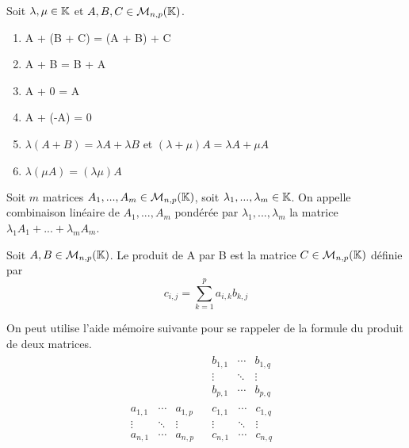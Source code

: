 \documentclass[a4paper, 12pt]{article}
\begin{document}
\begin{proprietes}
    Soit $\lambda, \mu \in \mathbb{K}$ et $A, B, C \in \mathcal{M}_{n, p}(\mathbb{K})$.
    \begin{enumerate}
        \item A + (B + C) = (A + B) + C
        \item A + B = B + A
        \item A + 0 = A
        \item A + (-A) = 0
        \item $\lambda(A + B) = \lambda A + \lambda B$ et $(\lambda + \mu)A = \lambda A + \mu A$
        \item $\lambda(\mu A) = (\lambda \mu)A$
    \end{enumerate}
\end{proprietes}

\begin{definition}
    Soit $m$ matrices $A_1, ..., A_m \in \mathcal{M}_{n, p}(\mathbb{K})$,
    soit $\lambda_1, ..., \lambda_m \in \mathbb{K}$.
    On appelle combinaison linéaire de $A_1, ..., A_m$ pondérée par $\lambda_1, ..., \lambda_m$ la matrice
    $\lambda_1 A_1 + ... + \lambda_m A_m$.
\end{definition}

\begin{definition}
    Soit $A, B \in \mathcal{M}_{n, p}(\mathbb{K})$.
    Le produit de A par B est la matrice $C \in \mathcal{M}_{n, p}(\mathbb{K})$ définie par
    $$
        c_{i, j} = \sum_{k = 1}^{p} a_{i, k} b_{k, j}
    $$
\end{definition}

\begin{remark}
    On peut utilise l'aide mémoire suivante pour se rappeler de la formule du produit de deux matrices.
    $$
    \begin{array}{ccc}
        & \begin{matrix}
            b_{1, 1} & \cdots & b_{1, q} \\
            \vdots & \ddots & \vdots \\
            b_{p, 1} & \cdots & b_{p, q}
        \end{matrix} & \\
        \begin{matrix}
            a_{1, 1} & \cdots & a_{1, p} \\
            \vdots & \ddots & \vdots \\
            a_{n, 1} & \cdots & a_{n, p}
        \end{matrix} &
        \begin{matrix}
            c_{1, 1} & \cdots & c_{1, q} \\
            \vdots & \ddots & \vdots \\
            c_{n, 1} & \cdots & c_{n, q}
        \end{matrix} &
    \end{array}
    $$
\end{remark}
\end{document}
